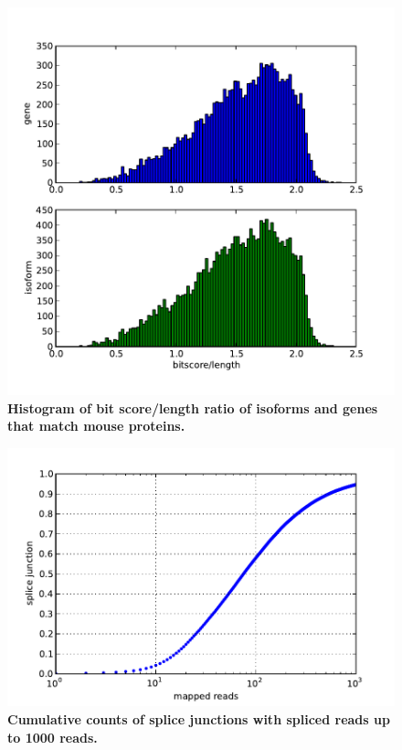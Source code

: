 \documentclass[10pt]{article}
\begin{document}
\begin{figure}[!ht]
\begin{center}
\includegraphics[width=5in]{bitscore.pdf}
\end{center}
\caption{
{\bf Histogram of bit score/length ratio of isoforms and genes that match mouse proteins.}
}
\label{bitscore}
\end{figure}

\begin{figure}[!ht]
\begin{center}
\includegraphics[width=5in]{cdf_single_splice.pdf}
\end{center}
\caption{
{\bf Cumulative counts of splice junctions with spliced reads up to 1000 reads.}
}
\label{cdf_single_splice}
\end{figure}
\end{document}

